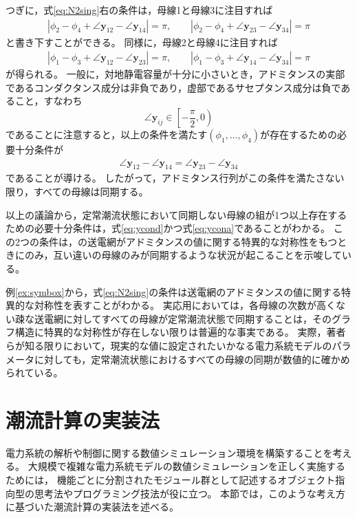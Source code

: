 \documentclass[tombow,dvipdfmx]{corona-a5-1.1}
\begin{document}
\begin{例}
つぎに，式\ref{eq:N2sing}右の条件は，母線1と母線3に注目すれば
\begin{align*}
|\phi_2 - \phi_4 + \angle \bm{y}_{12} - \angle \bm{y}_{14}|=\pi
,\qquad
|\phi_2 - \phi_4 + \angle \bm{y}_{23} - \angle \bm{y}_{34}|=\pi
\end{align*}
と書き下すことができる。
同様に，母線2と母線4に注目すれば
\begin{align*}
|\phi_1 - \phi_3 + \angle \bm{y}_{12} - \angle \bm{y}_{23}|=\pi
,\qquad
|\phi_1 - \phi_3 + \angle \bm{y}_{14} - \angle \bm{y}_{34}|=\pi
\end{align*}
が得られる。
一般に，対地静電容量が十分に小さいとき，アドミタンスの実部であるコンダクタンス成分は非負であり，虚部であるサセプタンス成分は負であること，すなわち
\[
\angle \bm{y}_{ij} \in \left[-\frac{\pi}{2},0 \right)
\]
であることに注意すると，以上の条件を満たす$(\phi_1,\ldots,\phi_4)$が存在するための必要十分条件が
\begin{align}\label{eq:ycona}
\angle \bm{y}_{12} - \angle \bm{y}_{14}=
\angle \bm{y}_{23} - \angle \bm{y}_{34}
\end{align}
であることが導ける。
したがって，アドミタンス行列がこの条件を満たさない限り，すべての母線は同期する。

以上の議論から，定常潮流状態において同期しない母線の組が1つ以上存在するための必要十分条件は，式\ref{eq:ycond}かつ式\ref{eq:ycona}であることがわかる。
この2つの条件は，の送電網がアドミタンスの値に関する特異的な対称性をもつときにのみ，互い違いの母線のみが同期するような状況が起こることを示唆している。
\end{例}

例\ref{ex:symbox}から，式\ref{eq:N2sing}の条件は送電網のアドミタンスの値に関する特異的な対称性を表すことがわかる。
実応用においては，各母線の次数が高くない疎な送電網に対してすべての母線が定常潮流状態で同期することは，そのグラフ構造に特異的な対称性が存在しない限りは普遍的な事実である。
実際，著者らが知る限りにおいて，現実的な値に設定されたいかなる電力系統モデルのパラメータに対しても，定常潮流状態におけるすべての母線の同期が数値的に確かめられている。

\section{潮流計算の実装法}

電力系統の解析や制御に関する数値シミュレーション環境を構築することを考える。
大規模で複雑な電力系統モデルの数値シミュレーションを正しく実施するためには，
機能ごとに分割されたモジュール群として記述するオブジェクト指向型の思考法やプログラミング技法が役に立つ。
本節では，このような考え方に基づいた潮流計算の実装法を述べる。
\end{document}
